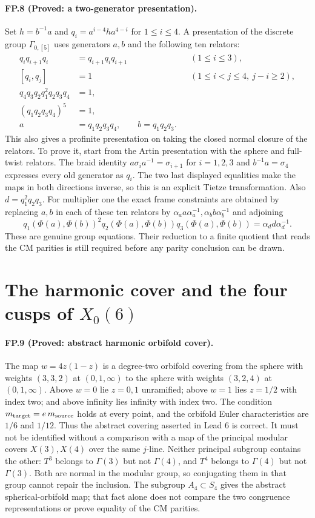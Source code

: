 \paragraph{FP.8 (Proved: a two-generator presentation).}
Set $h=b^{-1}a$ and $q_i=a^{i-4}ha^{4-i}$ for $1\leq i\leq4$.
A presentation of the discrete group $\Gamma_{0,[5]}$ uses generators
$a,b$ and the following ten relators:
\begin{align*}
 q_iq_{i+1}q_i&=q_{i+1}q_iq_{i+1}&&(1\leq i\leq3),\\
 [q_i,q_j]&=1&&(1\leq i<j\leq4,\ j-i\geq2),\\
 q_4q_3q_2q_1^2q_2q_3q_4&=1,\\
 (q_1q_2q_3q_4)^5&=1,\\
 a&=q_1q_2q_3q_4,\qquad b=q_1q_2q_3.
\end{align*}
This also gives a profinite presentation on taking the closed normal
closure of the relators. To prove it, start from the Artin presentation
with the sphere and full-twist relators. The braid identity
$a\sigma_i a^{-1}=\sigma_{i+1}$ for $i=1,2,3$ and
$b^{-1}a=\sigma_4$ expresses every old generator as $q_i$.
The two last displayed equalities make the maps in both directions
inverse, so this is an explicit Tietze transformation. Also
$d=q_1^2q_2q_3$.
For multiplier one the exact frame constraints are obtained by replacing
$a,b$ in each of these ten relators by
$\alpha_a a\alpha_a^{-1},\alpha_b b\alpha_b^{-1}$ and adjoining
\[
 q_1(\Phi(a),\Phi(b))^2q_2(\Phi(a),\Phi(b))q_3(\Phi(a),\Phi(b))
 =\alpha_d d\alpha_d^{-1}.
\]
These are genuine group equations. Their reduction to a finite quotient
that reads the CM parities is still required before any parity conclusion
can be drawn.

\section*{The harmonic cover and the four cusps of $X_0(6)$}
\paragraph{FP.9 (Proved: abstract harmonic orbifold cover).}
The map $w=4z(1-z)$ is a degree-two orbifold covering from the sphere with
weights $(3,3,2)$ at $(0,1,\infty)$ to the sphere with weights $(3,2,4)$ at
$(0,1,\infty)$. Above $w=0$ lie $z=0,1$ unramified; above $w=1$ lies
$z=1/2$ with index two; and above infinity lies infinity with index two.
The condition $m_{\rm target}=e\,m_{\rm source}$ holds at every point,
and the orbifold Euler characteristics are $1/6$ and $1/12$.
Thus the abstract covering asserted in Lead 6 is correct.
It must not be identified without a comparison with a map of the
principal modular covers $X(3),X(4)$ over the same $j$-line.
Neither principal subgroup contains the other: $T^3$ belongs to
$\Gamma(3)$ but not $\Gamma(4)$, and $T^4$ belongs to
$\Gamma(4)$ but not $\Gamma(3)$. Both are normal in the modular group,
so conjugating them in that group cannot repair the inclusion.
The subgroup $A_4\subset S_4$ gives the abstract spherical-orbifold map;
that fact alone does not compare the two congruence representations or
prove equality of the CM parities.

